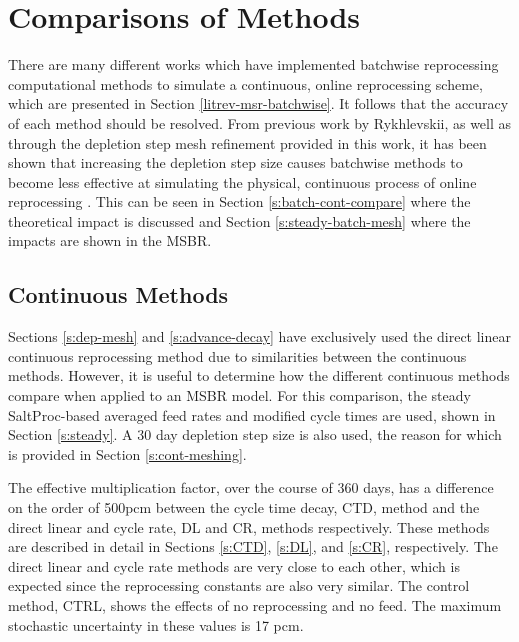 \section{Comparisons of Methods}

There are many different works which have implemented batchwise reprocessing computational methods to simulate a continuous, online reprocessing scheme, which are presented in Section \ref{litrev-msr-batchwise}.
It follows that the accuracy of each method should be resolved.
From previous work by Rykhlevskii, as well as through the depletion step mesh refinement provided in this work, it has been shown that increasing the depletion step size causes batchwise methods to become less effective at simulating the physical, continuous process of online reprocessing \cite{rykhlevskii_fuel_2020}.
This can be seen in Section \ref{s:batch-cont-compare} where the theoretical impact is discussed and Section \ref{s:steady-batch-mesh} where the impacts are shown in the MSBR.

\subsection{Continuous Methods}

Sections \ref{s:dep-mesh} and \ref{s:advance-decay} have exclusively used the direct linear continuous reprocessing method due to similarities between the continuous methods.
However, it is useful to determine how the different continuous methods compare when applied to an MSBR model.
For this comparison, the steady SaltProc-based averaged feed rates and modified cycle times are used, shown in Section \ref{s:steady}.
A 30 day depletion step size is also used, the reason for which is provided in Section \ref{s:cont-meshing}.


The effective multiplication factor, over the course of 360 days, has a difference on the order of 500pcm between the cycle time decay, CTD, method and the direct linear and cycle rate, DL and CR, methods respectively.
These methods are described in detail in Sections \ref{s:CTD}, \ref{s:DL}, and \ref{s:CR}, respectively.
The direct linear and cycle rate methods are very close to each other, which is expected since the reprocessing constants are also very similar. The control method, CTRL, shows the effects of no reprocessing and no feed.
The maximum stochastic uncertainty in these values is 17 pcm.

